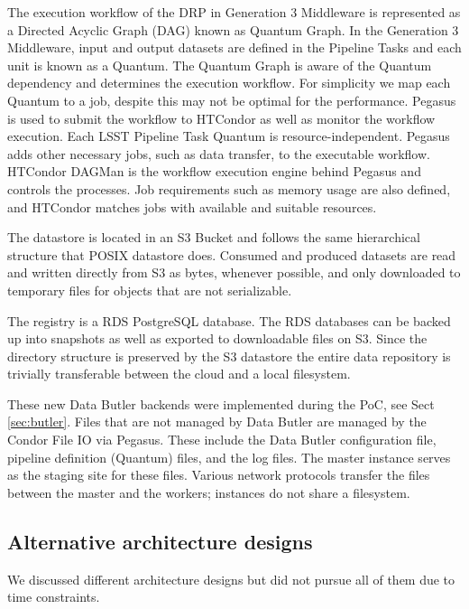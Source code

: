 The execution workflow of the DRP in Generation 3 Middleware is represented as a Directed Acyclic Graph (DAG) known as Quantum Graph.
In the Generation 3 Middleware, input and output datasets are defined in the Pipeline Tasks and each unit is known as a Quantum.
The Quantum Graph is aware of the Quantum dependency and determines the execution workflow.
For simplicity we map each Quantum to a job, despite this may not be optimal for the performance.
Pegasus is used to submit the workflow to HTCondor as well as monitor the workflow execution.
Each LSST Pipeline Task Quantum is resource-independent. Pegasus adds other necessary jobs, such as data transfer, to the executable workflow. HTCondor DAGMan is the workflow execution engine behind Pegasus and controls the processes.
Job requirements such as memory usage are also defined, and HTCondor matches jobs with available and suitable resources.

The datastore is located in an S3 Bucket and follows the same hierarchical structure that POSIX datastore does. Consumed and produced datasets are read and written directly from S3 as bytes, whenever possible, and only downloaded to temporary files for objects that are not serializable.

The registry is a RDS PostgreSQL database. The RDS databases can be backed up into snapshots as well as exported to downloadable files on S3. Since the directory structure is preserved by the S3 datastore the entire data repository is trivially transferable between the cloud and a local filesystem.

These new Data Butler backends were implemented during the PoC, see Sect \ref{sec:butler}. Files that are not managed by Data Butler are managed by the Condor File IO via Pegasus. These include the Data Butler configuration file, pipeline definition (Quantum) files, and the log files. The master instance serves as the staging site for these files. Various network protocols transfer the files between the master and the workers; instances do not share a filesystem.

\subsection{Alternative architecture designs}

We discussed different architecture designs but did not pursue all of them due to time constraints.

